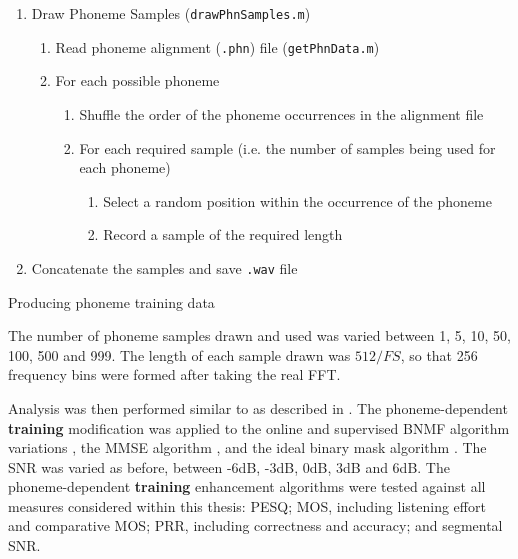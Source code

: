 \begin{algorithm}
\begin{enumerate}
\item Draw Phoneme Samples (\lstinline!drawPhnSamples.m!)

\begin{enumerate}
\item Read phoneme alignment (\lstinline!.phn!) file (\lstinline!getPhnData.m!)
\item For each possible phoneme

\begin{enumerate}
\item Shuffle the order of the phoneme occurrences in the alignment file
\item For each required sample (i.e. the number of samples being used for
each phoneme)

\begin{enumerate}
\item Select a random position within the occurrence of the phoneme
\item Record a sample of the required length
\end{enumerate}
\end{enumerate}
\end{enumerate}
\item Concatenate the samples and save \lstinline!.wav! file
\end{enumerate}
\protect\caption{\label{alg:Producing-phoneme-training}Producing phoneme training
data}


\end{algorithm}


The number of phoneme samples drawn and used was varied between 1,
5, 10, 50, 100, 500 and 999. The length of each sample drawn was $512/FS$,
so that 256 frequency bins were formed after taking the real \ac{FFT}.

Analysis was then performed similar to as described in .
The phoneme-dependent \textbf{training} modification was applied to
the online and supervised \ac{BNMF} algorithm variations \citep{mohammadiha2013supervised},
the \ac{MMSE} algorithm \citep{Brookes1997}, and the ideal binary
mask algorithm \citep{Wojcicki2011}. The \ac{SNR} was varied as
before, between -6dB, -3dB, 0dB, 3dB and 6dB. The phoneme-dependent\textbf{
training} enhancement algorithms were tested against all measures
considered within this thesis: \ac{PESQ}; \ac{MOS}, including listening
effort and comparative \ac{MOS}; \ac{PRR}, including correctness
and accuracy; and segmental \ac{SNR}.


